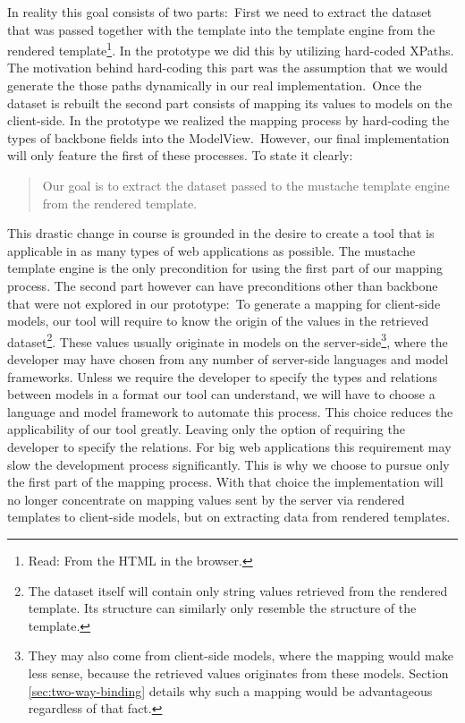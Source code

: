 \documentclass[thesis.tex]{subfiles}
\begin{document}
In reality this goal consists of two parts:\
First we need to extract the dataset that was passed together with the template
into the template engine from the rendered template\footnote{Read:
From the HTML in the browser.}.
In the prototype we did this by utilizing hard-coded XPaths. The motivation
behind hard-coding this part was the assumption that we would generate the those
paths dynamically in our real implementation.\
Once the dataset is rebuilt the second part consists of mapping its values
to models on the client-side. In the prototype we realized the mapping process
by hard-coding the types of backbone fields into the ModelView.\
However, our final implementation will only feature the first of these
processes.
To state it clearly:
\begin{quote}
Our goal is to extract the dataset passed to the mustache template engine from
the rendered template.
\end{quote}

This drastic change in course is grounded in the desire to create a tool that
is applicable in as many types of web applications as possible.
The mustache template engine is the only precondition for using the first part
of our mapping process. The second part however can have preconditions
other than backbone that were not explored in our prototype:\
To generate a mapping for client-side models, our tool will require to know the
origin of the values in the retrieved dataset\footnote{The dataset itself will
	contain only string values retrieved from the rendered template.
	Its structure can similarly only resemble the structure of the template.}.
These values usually originate in models on the server-side\footnote{They
	may also come from client-side models, where the mapping would make less
	sense, because the retrieved values originates from these models.
	Section \ref{sec:two-way-binding} details why such a mapping would be
	advantageous regardless of that fact.}, where the developer may have chosen
from any number of server-side languages
and model frameworks. Unless we require the developer to specify the types and
relations between models in a format our tool can understand, we will have to
choose a language and model framework to automate this process. This choice
reduces the applicability of our tool greatly. Leaving only the option of
requiring the developer to specify the relations. For big web applications this
requirement may slow the development process significantly.
This is why we choose to pursue only the first part of the mapping process.
With that choice the implementation will no longer concentrate on mapping values
sent by the server via rendered templates to client-side models,
but on extracting data from rendered templates.
\end{document}
